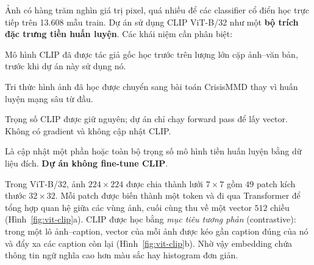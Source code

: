 Ảnh có hàng trăm nghìn giá trị pixel, quá nhiều để các classifier cổ điển học
trực tiếp trên 13.608 mẫu train. Dự án sử dụng CLIP ViT-B/32
\cite{clip2021} như một \textbf{bộ trích đặc trưng tiền huấn luyện}. Các khái
niệm cần phân biệt:

\begin{description}[leftmargin=4.4cm,style=nextline]
  \item[Tiền huấn luyện] Mô hình CLIP đã được tác giả gốc học trước trên lượng
        lớn cặp ảnh--văn bản, trước khi dự án này sử dụng nó.
  \item[Transfer learning] Tri thức hình ảnh đã học được chuyển sang bài toán
        CrisisMMD thay vì huấn luyện mạng sâu từ đầu.
  \item[Frozen feature extractor] Trọng số CLIP được giữ nguyên; dự án chỉ chạy
        forward pass để lấy vector. Không có gradient và không cập nhật CLIP.
  \item[Fine-tuning] Là cập nhật một phần hoặc toàn bộ trọng số mô hình tiền
        huấn luyện bằng dữ liệu đích. \textbf{Dự án không fine-tune CLIP}.
\end{description}

Trong ViT-B/32, ảnh \(224\times224\) được chia thành lưới \(7\times7\) gồm
\(49\) patch kích thước \(32\times32\). Mỗi patch được biến thành một token và
đi qua Transformer để tổng hợp quan hệ giữa các vùng ảnh, cuối cùng thu về một
vector \(512\) chiều (Hình~\ref{fig:vit-clip}a). CLIP được học bằng
\emph{mục tiêu tương phản} (contrastive): trong một lô ảnh--caption, vector của
mỗi ảnh được kéo gần caption đúng của nó và đẩy xa các caption còn lại
(Hình~\ref{fig:vit-clip}b). Nhờ vậy embedding chứa thông tin ngữ nghĩa cao hơn
màu sắc hay histogram đơn giản.

